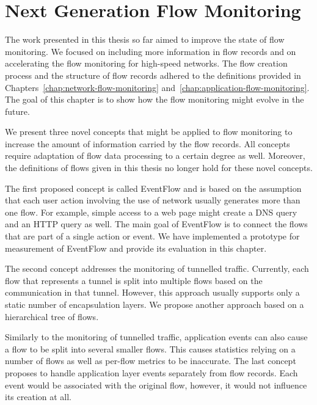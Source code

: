 \chapter{Next Generation Flow Monitoring}\label{chap:next-generation-flow}

\begin{chapintro}

The work presented in this thesis so far aimed to improve the state of flow monitoring. We focused on including more information in flow records and on accelerating the flow monitoring for high-speed networks. The flow creation process and the structure of flow records adhered to the definitions provided in Chapters~\ref{chap:network-flow-monitoring} and~\ref{chap:application-flow-monitoring}. The goal of this chapter is to show how the flow monitoring might evolve in the future.

We present three novel concepts that might be applied to flow monitoring to increase the amount of information carried by the flow records. All concepts require adaptation of flow data processing to a certain degree as well. Moreover, the definitions of flows given in this thesis no longer hold for these novel concepts.

The first proposed concept is called EventFlow and is based on the assumption that each user action involving the use of network usually generates more than one flow. For example, simple access to a web page might create a DNS query and an HTTP query as well. The main goal of EventFlow is to connect the flows that are part of a single action or event. We have implemented a prototype for measurement of EventFlow and provide its evaluation in this chapter.

The second concept addresses the monitoring of tunnelled traffic. Currently, each flow that represents a tunnel is split into multiple flows based on the communication in that tunnel. However, this approach usually supports only a static number of encapsulation layers. We propose another approach based on a hierarchical tree of flows.

Similarly to the monitoring of tunnelled traffic, application events can also cause a flow to be split into several smaller flows. This causes statistics relying on a number of flows as well as per-flow metrics to be inaccurate. The last concept proposes to handle application layer events separately from flow records. Each event would be associated with the original flow, however, it would not influence its creation at all.


\end{chapintro}
